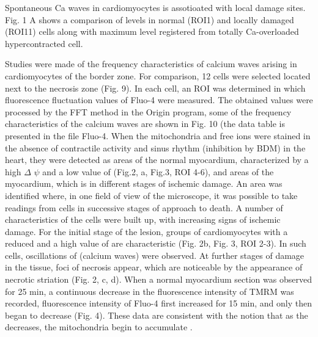 \documentclass{biophys-new}
\begin{document}
Spontaneous Ca waves in cardiomyocytes is assotioated with local damage sites.
Fig. 1 A shows a comparison of  levels in normal (ROI1) and locally damaged (ROI11) cells along with maximum  level registered from totally Ca-overloaded hypercontracted cell.

Studies were made of the frequency characteristics of calcium waves arising in cardiomyocytes of the border zone. For comparison, 12 cells were selected located next to the necrosis zone (Fig. 9). In each cell, an ROI was determined in which fluorescence fluctuation values of Fluo-4 were measured. The obtained values were processed by the FFT method in the Origin program, some of the frequency characteristics of the calcium waves are shown in Fig. 10 (the data table is presented in the file Fluo-4.
When the mitochondria and free  ions were stained in the absence of contractile activity and sinus rhythm (inhibition by BDM) in the heart, they were detected as areas of the normal myocardium, characterized by a high $\Delta$ $\psi$ and a low value of  (Fig.2, a, Fig.3, ROI 4-6), and areas of the myocardium, which is in different stages of ischemic damage.
An area was identified where, in one field of view of the microscope, it was possible to take readings from cells in successive stages of approach to death. A number of characteristics of the cells were built up, with increasing signs of ischemic damage.
For the initial stage of the lesion, groups of cardiomyocytes with a reduced and a high value of  are characteristic (Fig. 2b, Fig. 3, ROI 2-3). In such cells, oscillations of  (calcium waves) were observed. At further stages of damage in the tissue, foci of necrosis appear, which are noticeable by the appearance of necrotic striation (Fig. 2, c, d). When a normal myocardium section was observed for 25 min, a continuous decrease in the fluorescence intensity of TMRM was recorded, fluorescence intensity of Fluo-4 first increased for 15 min, and only then began to decrease (Fig. 4). These data are consistent with the notion that as the decreases, the mitochondria begin to accumulate .

\end{document}
